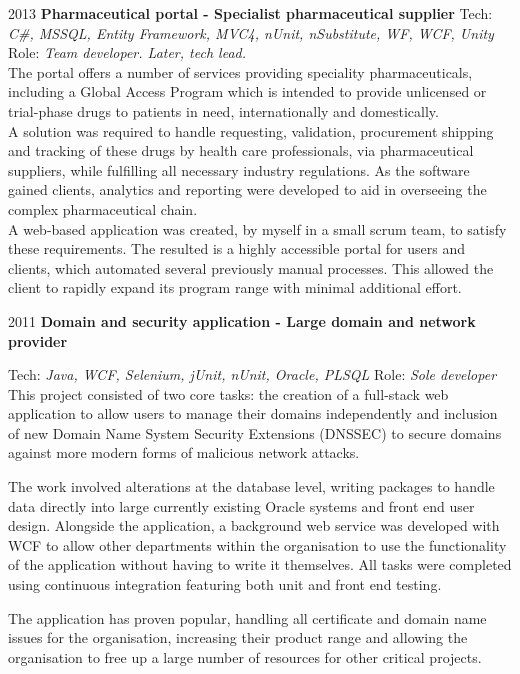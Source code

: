 \documentclass[]{friggeri-cv} %
\begin{document}
\begin{entrylist}
\entry
{2013}
{\textbf{Pharmaceutical portal - Specialist pharmaceutical supplier}}
{}
{Tech:  \emph{C\#, MSSQL, Entity Framework, MVC4, nUnit, nSubstitute, WF, WCF, Unity} \\ Role: \emph{Team developer. Later, tech lead.}\\
The portal offers a number of services providing speciality pharmaceuticals, including
a Global Access Program which is intended to provide unlicensed or trial-phase drugs
to patients in need, internationally and domestically.\\
A solution was required to handle
requesting, validation, procurement shipping and tracking of these drugs by health care
professionals, via pharmaceutical suppliers, while fulfilling all necessary industry regulations. As the software gained clients, analytics and reporting were developed
to aid in overseeing the complex pharmaceutical chain. \\
A web-based application was created, by myself in a small scrum team, to satisfy these
requirements. The resulted is a highly accessible portal for users and clients, which automated several previously manual processes. This allowed the client to rapidly expand
its program range with minimal additional effort. 
}

\entry
{2011}
{\textbf{Domain and security application - Large domain and network provider}}
{}
{Tech: \emph{Java, WCF, Selenium, jUnit, nUnit, Oracle, PLSQL} \hfill Role: \emph{Sole developer} \\
This project consisted of two core tasks: the creation of a full-stack web application to allow users to manage their domains independently and inclusion of new Domain Name System Security Extensions (DNSSEC) to secure domains against more modern forms of malicious network attacks.

The work involved alterations at the database level, writing packages to handle data directly into large currently existing Oracle systems  and front end user design. Alongside the application, a background web service was developed with WCF to allow other departments within the organisation to use the functionality of the application without having to write it themselves. All tasks were completed using continuous integration featuring both unit and front end testing.

The application has proven popular, handling all certificate and domain name issues for the organisation, increasing their product range and allowing the organisation to free up a large number of resources for other critical projects.
}

\end{entrylist}
\end{document}
